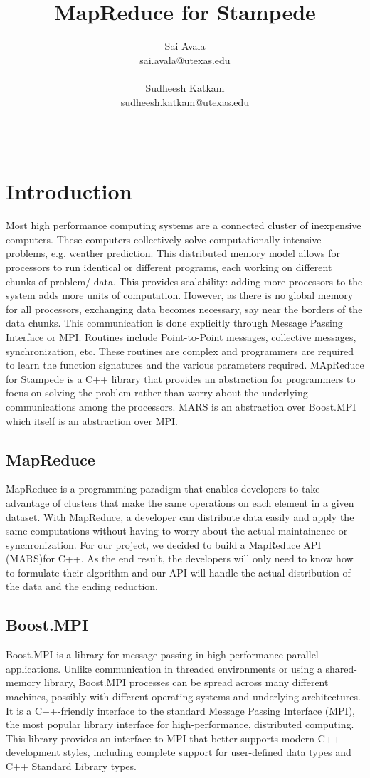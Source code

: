 \documentclass[11pt]{article}
\title{MapReduce for Stampede}
\author{
  Sai Avala\\ 
  \href{mailto:sai.avala@utexas.edu}
          {sai.avala@utexas.edu}  \\ \\
  Sudheesh Katkam \\
  \href{mailto:sudheesh.katkam@utexas.edu}
          {sudheesh.katkam@utexas.edu}  }
\begin{document}
\maketitle
\newpage
\rule{6.0in}{.001in}
\tableofcontents
\newpage

\section{Introduction}
Most high performance computing systems are a connected cluster of inexpensive computers. These computers collectively solve computationally intensive problems, e.g. weather prediction. This distributed memory model allows for processors to run identical or different programs, each working on different chunks of problem/ data. This provides scalability: adding more processors to the system adds more units of computation. However, as there is no global memory for all processors, exchanging data becomes necessary, say near the borders of the data chunks. This communication is done explicitly through Message Passing Interface or MPI. Routines include Point-to-Point messages, collective messages, synchronization, etc. These routines are complex and programmers are required to learn the function signatures and the various parameters required. MApReduce for Stampede is a C++ library that provides an abstraction for programmers to focus on solving the problem rather than worry about the underlying communications among the processors. MARS is an abstraction over Boost.MPI which itself is an abstraction over MPI.

\subsection{MapReduce}
MapReduce is a programming paradigm that enables developers to take advantage of clusters that make the same operations on each element in a given dataset. With MapReduce, a developer can distribute data easily and apply the same computations without having to worry about the actual maintainence or synchronization. For our project, we decided to build a MapReduce API (MARS)for C++. As the end result, the developers will only need to know how to formulate their algorithm and our API will handle the actual distribution of the data and the ending reduction.

\subsection{Boost.MPI}
Boost.MPI is a library for message passing in high-performance parallel applications. Unlike communication in threaded environments or using a shared-memory library, Boost.MPI processes can be spread across many different machines, possibly with different operating systems and underlying architectures. It is a C++-friendly interface to the standard Message Passing Interface (MPI), the most popular library interface for high-performance, distributed computing. This library provides an interface to MPI that better supports modern C++ development styles, including complete support for user-defined data types and C++ Standard Library types.
\end{document}
